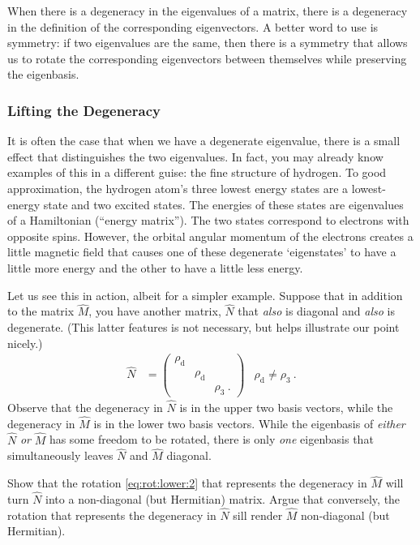 \documentclass[12pt, oneside]{report}    %
\begin{document}
\begin{bigidea}
When there is a degeneracy in the eigenvalues of a matrix, there is a degeneracy in the definition of the corresponding eigenvectors. A better word to use is symmetry: if two eigenvalues are the same, then there is a symmetry that allows us to rotate the corresponding eigenvectors between themselves while preserving the eigenbasis.
\end{bigidea}

\subsubsection*{Lifting the Degeneracy}

It is often the case that when we have a degenerate eigenvalue, there is a small effect that distinguishes the two eigenvalues. In fact, you may already know examples of this in a different guise: the fine structure of hydrogen. To good approximation, the hydrogen atom's three lowest energy states are a lowest-energy  state and two excited  states. The energies of these states are eigenvalues of a Hamiltonian (``energy matrix''). The two  states correspond to electrons with opposite spins. However, the orbital angular momentum of the electrons creates a little magnetic field that causes one of these degenerate `eigenstates' to have a little more energy and the other to have a little less energy. 

Let us see this in action, albeit for a simpler example. Suppose that in addition to the matrix $\hat M$, you have another matrix, $\hat N$ that \emph{also} is diagonal and \emph{also} is degenerate. (This latter features is not necessary, but helps illustrate our point nicely.) 
\begin{align} 
    \hat N &= 
    \begin{pmatrix}
        \rho_\text{d} & & \\
        & \rho_\text{d} & \\
        & & \rho_3 \ .
    \end{pmatrix}
    &
    \rho_\text{d}  \neq \rho_3\ .
    \label{eq:degenerate:eigenvalue:diagonal:too} 
\end{align}
Observe that the degeneracy in $\hat N$ is in the upper two basis vectors, while the degeneracy in $\hat M$ is in the lower two basis vectors. While the eigenbasis of \emph{either} $\hat N$ \emph{or} $\hat M$ has some freedom to be rotated, there is only \emph{one} eigenbasis that simultaneously leaves $\hat N$ and $\hat M$ diagonal.
\begin{exercise}
Show that the rotation \eqref{eq:rot:lower:2} that represents the degeneracy in $\hat M$ will turn $\hat N$ into a non-diagonal (but Hermitian) matrix. Argue that conversely, the rotation that represents the degeneracy in $\hat N$ sill render $\hat M$ non-diagonal (but Hermitian).
\end{exercise}
\end{document}
